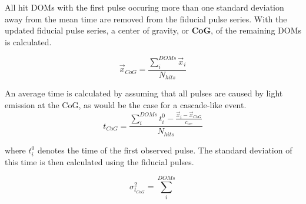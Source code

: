 All hit DOMs with the first pulse occuring more than one standard deviation away from the mean time are removed from the fiducial pulse series.
With the updated fiducial pulse series, a center of gravity, or \textbf{CoG}, of the remaining DOMs is calculated.

\begin{equation}
	\vec{x}_{CoG}=\frac{\sum_i^{DOMs} \vec{x}_i}{N_{hits}}
\end{equation}

An average time is calculated by assuming that all pulses are caused by light emission at the CoG, as would be the case for a cascade-like event.
\begin{equation}
	t_{CoG} = \frac{\sum_i^{DOMs} t_i^0 - \frac{\vec{x}_i - \vec{x}_{CoG}}{c_{ice}}}{N_{hits}}
\end{equation}

where $t_i^0$ denotes the time of the first observed pulse.
The standard deviation of this time is then calculated using the fiducial pulses.

\begin{equation}
	\sigma_{t_{CoG}}^2 = \sum_{i}^{DOMs} 
\end{equation}

